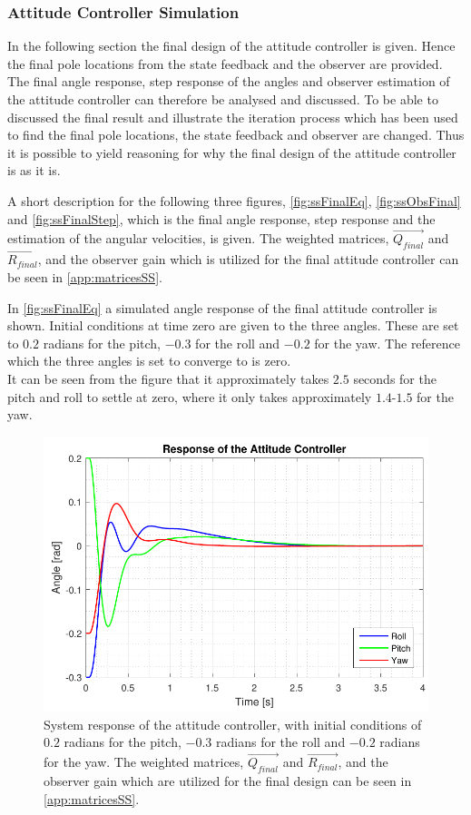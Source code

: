\subsubsection{Attitude Controller Simulation}
In the following section the final design of the attitude controller is given. Hence the final pole locations from the state feedback and the observer are provided. The final angle response, step response of the angles and observer estimation of the attitude controller can therefore be analysed and discussed. To be able to discussed the final result and illustrate the iteration process which has been used to find the final pole locations, the state feedback and observer are changed. Thus it is possible to yield reasoning for why the final design of the attitude controller is as it is.

A short description for the following three figures, \autoref{fig:ssFinalEq}, \autoref{fig:ssObsFinal} and \autoref{fig:ssFinalStep}, which is the final angle response, step response and the estimation of the angular velocities, is given. The weighted matrices, $\vec{Q_{final}}$ and $\vec{R_{final}}$, and the observer gain which is utilized for the final attitude controller can be seen in \autoref{app:matricesSS}.

In \autoref{fig:ssFinalEq} a simulated angle response of the final attitude controller is shown. Initial conditions at time zero are given to the three angles. These are set to $0.2$ radians for the pitch, $-0.3$ for the roll and $-0.2$ for the yaw. The reference which the three angles is set to converge to is zero. \\ It can be seen from the figure that it approximately takes $2.5$ seconds for the pitch and roll to settle at zero, where it only takes approximately $1.4$-$1.5$ for the yaw.

\begin{figure}[H]
	\centering
	\includegraphics[scale=0.8]{figures/ssFinalEq.pdf}
	\caption{System response of the attitude controller, with initial conditions of $0.2$ radians for the pitch, $-0.3$ radians for the roll and $-0.2$ radians for the yaw. The weighted matrices, $\vec{Q_{final}}$ and $\vec{R_{final}}$, and the observer gain which are utilized for the final design can be seen in \autoref{app:matricesSS}.}
	\label{fig:ssFinalEq}
\end{figure}

